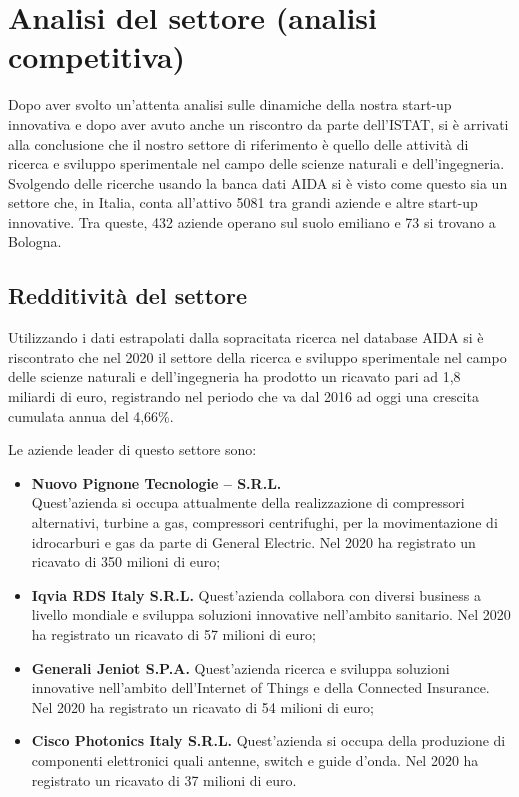 

\renewcommand\tabularxcolumn[1]{m{#1}}

\section{Analisi del settore (analisi competitiva)}

Dopo aver svolto un'attenta analisi sulle dinamiche della nostra start-up innovativa e dopo aver avuto anche un riscontro da parte dell'ISTAT, si è arrivati alla conclusione che il nostro settore di riferimento è quello delle attività di ricerca e sviluppo sperimentale nel campo delle scienze naturali e dell'ingegneria. Svolgendo delle ricerche usando la banca dati AIDA si è visto come questo sia un settore che, in Italia, conta all'attivo 5081 tra grandi aziende e altre start-up innovative. Tra queste, 432 aziende operano sul suolo emiliano e 73 si trovano a Bologna.

\subsection{Redditività del settore}

Utilizzando i dati estrapolati dalla sopracitata ricerca nel database AIDA si è riscontrato che nel 2020 il settore della ricerca e sviluppo sperimentale nel campo delle scienze naturali e dell'ingegneria ha prodotto un ricavato pari ad 1,8 miliardi di euro, registrando nel periodo che va dal 2016 ad oggi una crescita cumulata annua del 4,66\%.

Le aziende leader di questo settore sono:
\begin{itemize}
	\item \textbf{Nuovo Pignone Tecnologie – S.R.L.}\\
	Quest’azienda si occupa attualmente della realizzazione di compressori alternativi, turbine a gas, compressori centrifughi, per la movimentazione di idrocarburi e gas da parte di General Electric.
	Nel 2020 ha registrato un ricavato di 350 milioni di euro;
	
	\item \textbf{Iqvia RDS Italy S.R.L.}
	Quest’azienda collabora con diversi business a livello mondiale e sviluppa soluzioni innovative nell’ambito sanitario.
	Nel 2020 ha registrato un ricavato di 57 milioni di euro;
	
	\item \textbf{Generali Jeniot S.P.A.}
	Quest’azienda ricerca e sviluppa soluzioni innovative nell’ambito dell’Internet of Things e della Connected Insurance.
	Nel 2020 ha registrato un ricavato di 54 milioni di euro;
	
	\item \textbf{Cisco Photonics Italy S.R.L.}
	Quest’azienda si occupa della produzione di componenti elettronici quali antenne, switch e guide d’onda.
	Nel 2020 ha registrato un ricavato di 37 milioni di euro.	
\end{itemize}

